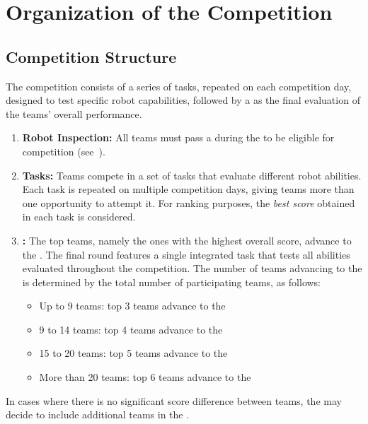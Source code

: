 \section{Organization of the Competition}\label{sec:procedure_during_competition}

\subsection{Competition Structure}\label{rule:structure}

The competition consists of a series of tasks, repeated on each competition day, designed to test specific robot capabilities, followed by a \FINAL{} as the final evaluation of the teams' overall performance.


\begin{enumerate}
	\item \textbf{Robot Inspection:} 
	All teams must pass a \RobotInspection{} during the \SetupDays{} to be eligible for competition (see~).

	\item \textbf{Tasks:}
	Teams compete in a set of tasks that evaluate different robot abilities.
	Each task is repeated on multiple competition days, giving teams more than one opportunity to attempt it.
	For ranking purposes, the \emph{best score} obtained in each task is considered.

	\item \textbf{\FINAL:} The top teams, namely the ones with the highest overall score, advance to the \FINAL{}.
	The final round features a single integrated task that tests all abilities evaluated throughout the competition.
	The number of teams advancing to the \FINAL{} is determined by the total number of participating teams, as follows:
	\begin{itemize}
		\item Up to 9 teams: top 3 teams advance to the \FINAL{}
		\item 9 to 14 teams: top 4 teams advance to the \FINAL{}
		\item 15 to 20 teams: top 5 teams advance to the \FINAL{}
		\item More than 20 teams: top 6 teams advance to the \FINAL{}
	\end{itemize}

\end{enumerate}

In cases where there is no significant score difference between teams, the \TC{} may decide to include additional teams in the \FINAL{}.

